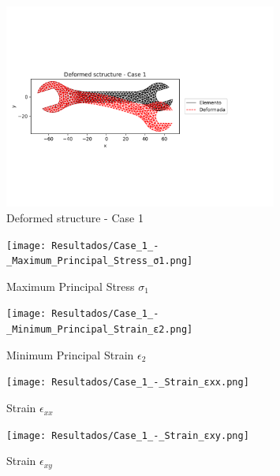 \documentclass[12pt]{article}
\begin{document}
\begin{figure}[H]
    \centering
    \includegraphics[width=0.8\textwidth]{Resultados/Deformed_sctructure_-_Case_1.png}
    \caption{Deformed structure - Case 1}
    \label{fig:fig1}
\end{figure}

\begin{figure}[H]
    \centering
    \begin{minipage}{0.48\textwidth}
        \centering
        \texttt{[image: Resultados/Case\_1\_-\_Maximum\_Principal\_Stress\_σ1.png]}
        \caption{Maximum Principal Stress $\sigma_1$}
        \label{fig:fig2}
    \end{minipage}
    \hfill
    \begin{minipage}{0.48\textwidth}
        \centering
        \texttt{[image: Resultados/Case\_1\_-\_Minimum\_Principal\_Strain\_ε2.png]}
        \caption{Minimum Principal Strain $\epsilon_2$}
        \label{fig:fig3}
    \end{minipage}
\end{figure}

\begin{figure}[H]
    \centering
    \begin{minipage}{0.48\textwidth}
        \centering
        \texttt{[image: Resultados/Case\_1\_-\_Strain\_εxx.png]}
        \caption{Strain $\epsilon_{xx}$}
        \label{fig:fig4}
    \end{minipage}
    \hfill
    \begin{minipage}{0.48\textwidth}
        \centering
        \texttt{[image: Resultados/Case\_1\_-\_Strain\_εxy.png]}
        \caption{Strain $\epsilon_{xy}$}
        \label{fig:fig5}
    \end{minipage}
\end{figure}
\end{document}
